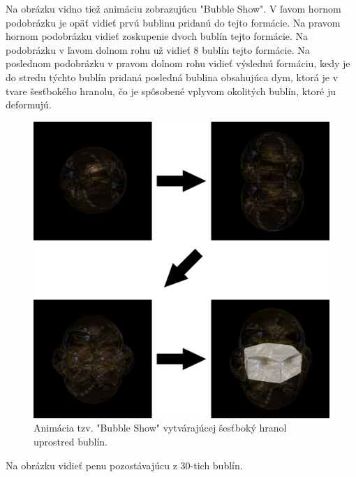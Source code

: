 Na obrázku  vidno tiež animáciu zobrazujúcu "Bubble Show". V ľavom hornom podobrázku je opäť vidieť prvú bublinu pridanú do tejto formácie. Na pravom hornom podobrázku vidieť zoskupenie dvoch bublín tejto formácie. Na podobrázku v ľavom dolnom rohu už vidieť 8 bublín tejto formácie. Na poslednom podobrázku v pravom dolnom rohu vidieť výslednú formáciu, kedy je do stredu týchto bublín pridaná posledná bublina obsahujúca dym, ktorá je v tvare šesťbokého hranolu, čo je spôsobené vplyvom okolitých bublín, ktoré ju deformujú.
\begin{figure}[H]
	\begin{center}
		\includegraphics[width=\textwidth]{images/bubble_show_2}
		\caption{Animácia tzv. "Bubble Show" vytvárajúcej šesťboký hranol uprostred bublín.}
		\label{img:bubble_show_2}
	\end{center}
\end{figure}
\newpage
Na obrázku  vidieť penu pozostávajúcu z 30-tich bublín.
